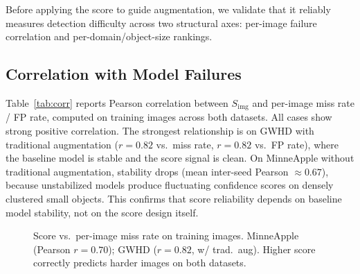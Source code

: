 \documentclass[conference]{IEEEtran}
\begin{document}
Before applying the score to guide augmentation, we validate that it
reliably measures detection difficulty across two structural axes:
per-image failure correlation and per-domain/object-size rankings.

\subsection{Correlation with Model Failures}

Table~\ref{tab:corr} reports Pearson correlation between
$S_{\mathrm{img}}$ and per-image miss rate / FP rate, computed on
training images across both datasets. All cases show strong positive
correlation. The strongest relationship is on GWHD with traditional
augmentation ($r{=}0.82$ vs.\ miss rate, $r{=}0.82$ vs.\ FP rate),
where the baseline model is stable and the score signal is
clean. On MinneApple without traditional augmentation,
stability drops (mean inter-seed Pearson ${\approx}0.67$), because
unstabilized models produce fluctuating confidence scores on
densely clustered small objects. This confirms that score reliability
depends on baseline model stability, not on the score design itself.

\begin{figure}[t]
\centering
\caption{Score vs.\ per-image miss rate on training images.
  MinneApple (Pearson $r{=}0.70$); GWHD ($r{=}0.82$, w/ trad.\ aug).
  Higher score correctly predicts harder images on both datasets.}
\label{fig:corr}
\end{figure}
\end{document}
